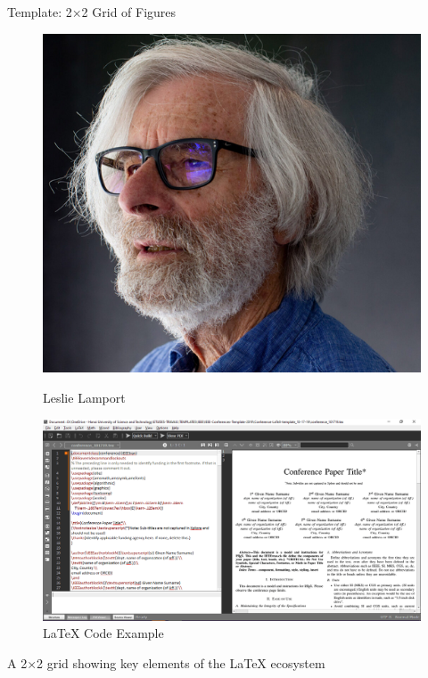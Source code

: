 \begin{frame}{Template: 2×2 Grid of Figures}
\begin{figure}
          \vspace{1cm}
          
          \begin{minipage}{0.2\textwidth}
               \centering
               \includegraphics[width=\textwidth]{figs/Lamport}
               \caption{Leslie Lamport}
               \label{fig:grid_bl}
          \end{minipage}
          \hspace{1cm}  %
          \begin{minipage}{0.2\textwidth}
               \centering
               \includegraphics[width=\textwidth]{figs/latex_code}
               \caption{LaTeX Code Example}
               \label{fig:grid_br}
          \end{minipage}
     \end{figure}
     
     \begin{center}
          A 2×2 grid showing key elements of the LaTeX ecosystem
     \end{center}
\end{frame}
